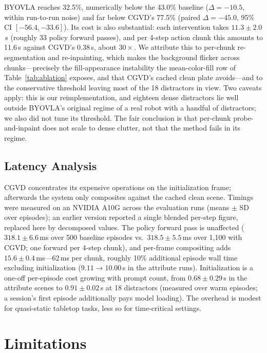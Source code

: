 \documentclass[letterpaper, 10 pt, conference]{ieeeconf}  %
\begin{document}
BYOVLA reaches 32.5\%, numerically below the 43.0\% baseline ($\Delta = -10.5$, within run-to-run noise) and far below CGVD's 77.5\% (paired $\Delta = -45.0$, 95\% CI $[-56.4, -33.6]$). Its cost is also substantial: each intervention takes $11.3 \pm 2.0$\,s (roughly 33 policy forward passes), and per 4-step action chunk this amounts to 11.6\,s against CGVD's 0.38\,s, about $30\times$. We attribute this to per-chunk re-segmentation and re-inpainting, which makes the background flicker across chunks---precisely the fill-appearance instability the mean-color-fill row of Table~\ref{tab:ablation} exposes, and that CGVD's cached clean plate avoids---and to the conservative threshold leaving most of the 18 distractors in view. Two caveats apply: this is our reimplementation, and eighteen dense distractors lie well outside BYOVLA's original regime of a real robot with a handful of distractors; we also did not tune its threshold. The fair conclusion is that per-chunk probe-and-inpaint does not scale to dense clutter, not that the method fails in its regime.

\subsection{Latency Analysis}
\label{sec:latency}
CGVD concentrates its expensive operations on the initialization frame; afterwards the system only composites against the cached clean scene. Timings were measured on an NVIDIA A10G across the evaluation runs (means $\pm$ SD over episodes); an earlier version reported a single blended per-step figure, replaced here by decomposed values. The policy forward pass is unaffected ($318.1 \pm 6.6$\,ms over 500 baseline episodes vs.\ $318.5 \pm 5.5$\,ms over 1{,}100 with CGVD; one forward per 4-step chunk), and per-frame compositing adds $15.6 \pm 0.4$\,ms---62\,ms per chunk, roughly 10\% additional episode wall time excluding initialization ($9.11 \rightarrow 10.00$\,s in the attribute runs). Initialization is a one-off per-episode cost growing with prompt count, from $0.68 \pm 0.29$\,s in the attribute scenes to $0.91 \pm 0.02$\,s at 18 distractors (measured over warm episodes; a session's first episode additionally pays model loading). The overhead is modest for quasi-static tabletop tasks, less so for time-critical settings.




\section{Limitations}
\label{sec:limitations}
\end{document}

